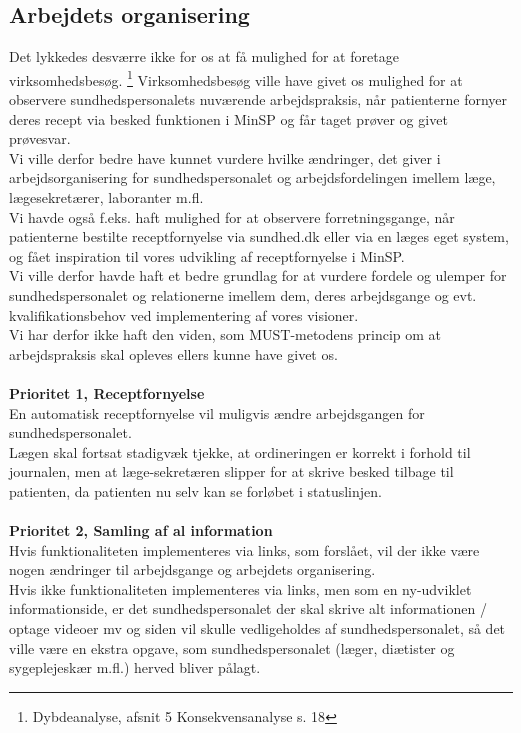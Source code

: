 \subsection{Arbejdets organisering} 
Det lykkedes desværre ikke for os at få mulighed for at foretage virksomhedsbesøg. \footnote{Dybdeanalyse, afsnit 5 Konsekvensanalyse s. 18} Virksomhedsbesøg ville have givet os mulighed for at observere sundhedspersonalets nuværende arbejdspraksis, når patienterne fornyer deres recept via besked funktionen i MinSP og får taget prøver og givet prøvesvar. \\
Vi ville derfor bedre have kunnet vurdere hvilke ændringer, det giver i arbejdsorganisering for sundhedspersonalet og arbejdsfordelingen imellem læge, lægesekretærer, laboranter m.fl.\\
Vi havde også f.eks. haft mulighed for at observere forretningsgange, når patienterne bestilte receptfornyelse via sundhed.dk eller via en læges eget system, og fået inspiration til vores udvikling af receptfornyelse i MinSP.\\
Vi ville derfor havde haft et bedre grundlag for at vurdere fordele og ulemper for sundhedspersonalet og relationerne imellem dem, deres arbejdsgange og evt. kvalifikationsbehov ved implementering af vores visioner.\\
Vi har derfor ikke haft den viden, som MUST-metodens princip om at arbejdspraksis skal opleves ellers kunne have givet os. 
\\
\\
\textbf{Prioritet 1, Receptfornyelse} \\
En automatisk receptfornyelse vil muligvis ændre arbejdsgangen for sundhedspersonalet. \\ 
Lægen skal fortsat stadigvæk tjekke, at ordineringen er korrekt i forhold til journalen, men at læge-sekretæren slipper for at skrive besked tilbage til patienten, da patienten nu selv kan se forløbet i statuslinjen.
%
\\\\
\textbf{Prioritet 2, Samling af al information} \\
Hvis funktionaliteten implementeres via links, som forslået, vil der ikke være nogen ændringer til arbejdsgange og arbejdets organisering. \\
Hvis ikke funktionaliteten implementeres via links, men som en ny-udviklet informationside, er det sundhedspersonalet der skal skrive alt informationen / optage videoer mv og siden vil skulle vedligeholdes af sundhedspersonalet, så det ville være en ekstra opgave, som sundhedspersonalet (læger, diætister og sygeplejeskær m.fl.) herved bliver pålagt.
